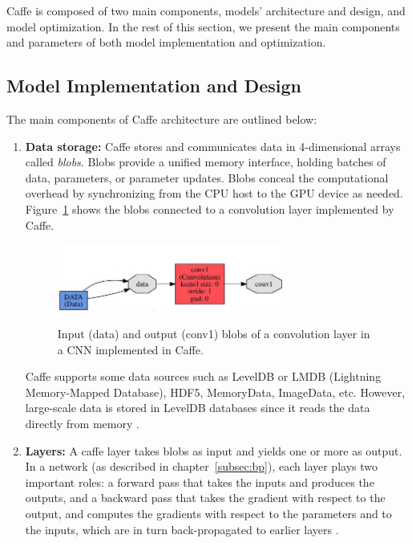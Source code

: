 Caffe is composed of two main components, models' architecture and design, and model optimization. In the rest of this section, we present the main components and parameters of both model implementation and optimization.
\subsection{Model Implementation and Design}
The main components of Caffe architecture are outlined below:
\begin{enumerate}

\item \textbf{Data storage:} Caffe stores and communicates data in 4-dimensional arrays called \textit{blobs}. Blobs provide a unified memory interface, holding batches of data, parameters, or parameter updates. Blobs conceal the computational overhead by synchronizing from the CPU host to the GPU device as needed. Figure~\ref{fig:blob} shows the blobs connected to a convolution layer implemented by Caffe.


\begin{figure}[H]
	\centering
	{\includegraphics[width=0.7\textwidth]{images/caffeconvlayer}}
	\caption{Input (data) and output (conv1) blobs of a convolution layer in a CNN implemented in Caffe.}
	\label{fig:blob}
\end{figure}


Caffe supports some data sources such as LevelDB or LMDB (Lightning Memory-Mapped Database), HDF5, MemoryData, ImageData, etc. However, large-scale data is stored in LevelDB databases since it reads the data directly from memory \cite{caffe}. 
\item \textbf{Layers:} A caffe layer takes blobs as input and yields one or more as output. In a network (as described in chapter~\ref{subsec:bp}), each layer plays two important roles: a forward pass that takes the inputs and produces the outputs, and a backward pass that takes the gradient with respect to the output, and computes the gradients with respect to the parameters and to the inputs, which are in turn back-propagated to earlier layers \cite{jia2014caffe}.


\end{enumerate}
